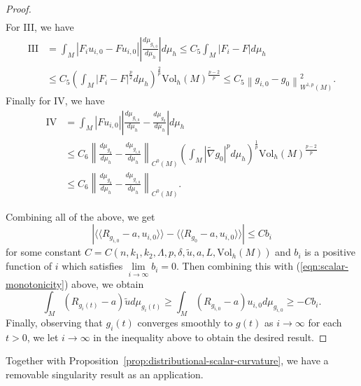 \documentclass[12pt]{amsart}
\theoremstyle{plain}
\theoremstyle{plain}
\theoremstyle{definition}
\theoremstyle{remark}
\numberwithin{equation}{subsection}
\newcommand{\hdel}{\tilde{\nabla}}
\begin{document}
\begin{proof}
\begin{align*}
    \end{align*}
    For III, we have
    \begin{align*}
        \text{III} &= \int_M |F_i u_{i,0} - F u_{i,0}|\left|\frac{d\mu_{g_{i,0}}}{d\mu_h}\right|d\mu_h \leq C_5 \int_M |F_i - F|d\mu_h \nonumber \\
        &\leq C_5 \left(\int_M |F_i - F|^\frac{p}{2}d\mu_h\right)^\frac{2}{p}\text{Vol}_h(M)^\frac{p-2}{p} \leq C_5\left\lVert g_{i,0} - g_0\right\rVert_{W^{1,p}(M)}^2.
    \end{align*}
    Finally for IV, we have
    \begin{align*}
        \text{IV} &= \int_M |F u_{i,0}|\left|\frac{d\mu_{g_{i,0}}}{d\mu_h} - \frac{d\mu_{g_0}}{d\mu_h}\right|d\mu_h \nonumber \\
        &\leq C_6\left\lVert \frac{d\mu_{g_0}}{d\mu_h} - \frac{d\mu_{g_{i,0}}}{d\mu_h}\right\rVert_{C^0(M)}\left(\int_M |\hdel g_0|^pd\mu_h\right)^\frac{1}{p}\text{Vol}_h(M)^\frac{p-2}{p} \nonumber \\
        &\leq C_6\left\lVert \frac{d\mu_{g_0}}{d\mu_h} - \frac{d\mu_{g_{i,0}}}{d\mu_h}\right\rVert_{C^0(M)}.
    \end{align*}

    Combining all of the above, we get
    \begin{equation*}
        \left|\langle\langle R_{g_{i,0}}-a, u_{i,0}\rangle\rangle - \langle\langle R_{g_0} - a, u_{i,0}\rangle\rangle  \right| \leq Cb_i
    \end{equation*}
    for some constant $C = C(n,k_1,k_2,\Lambda,p,\delta,\tilde{u},a,L,\text{Vol}_h(M))$ and $b_i$ is a positive function of $i$ which satisfies $\lim\limits_{i\to\infty} b_i = 0$. Then combining this with (\ref{eqn:scalar-monotonicity}) above, we obtain
    \begin{equation*}
        \int_M (R_{g_i(t)}-a)\tilde{u}d\mu_{g_i(t)} \geq \int_M (R_{g_{i,0}}-a)u_{i,0}d\mu_{g_{i,0}} \geq -Cb_i.
    \end{equation*}
    Finally, observing that $g_i(t)$ converges smoothly to $g(t)$ as $i \to \infty$ for each $t>0$, we let $i \to \infty$ in the inequality above to obtain the desired result.
\end{proof}

Together with Proposition~\ref{prop:distributional-scalar-curvature}, we have a removable singularity result as an application.
\end{document}
